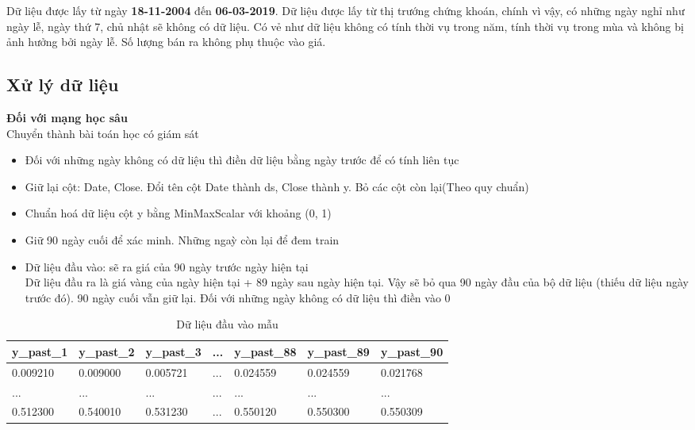 Dữ liệu được lấy từ ngày \textbf{18-11-2004} đến \textbf{06-03-2019}. 
Dữ liệu được lấy từ thị trướng chứng khoán, chính vì vậy, có những ngày nghỉ như ngày lễ, ngày thứ 7, chủ nhật sẽ không có dữ liệu.
Có vẻ như dữ liệu không có tính thời vụ trong năm, tính thời vụ trong mùa và không bị ảnh hưởng bởi ngày lễ. Số lượng bán ra không phụ thuộc vào giá.

\subsection{Xử lý dữ liệu}

\textbf{Đối với mạng học sâu} \\
Chuyển thành bài toán học có giám sát
\begin{itemize}
    \item Đối với những ngày không có dữ liệu thì điền dữ liệu bằng ngày trước để có tính liên tục \\
    \item Giữ lại cột: Date, Close. Đổi tên cột Date thành ds, Close thành y. Bỏ các cột còn lại(Theo quy chuẩn) \\
    \item Chuẩn hoá dữ liệu cột y bằng MinMaxScalar với khoảng (0, 1) \\
    \item Giữ 90 ngày cuối để xác minh. Những ngaỳ còn lại để đem train \\
    \item Dữ liệu đầu vào: sẽ ra giá của 90 ngày trước ngày hiện tại \\
    Dữ liệu đầu ra là giá vàng của ngày hiện tại +  89 ngày sau ngày hiện tại. Vậy sẽ bỏ qua 90 ngày đầu của bộ dữ liệu (thiếu dữ liệu ngày trước đó). 90 ngày cuối vẫn giữ lại. Đối với những ngày không có dữ liệu thì điền vào 0 \\
\end{itemize}
\begin{table}[h]
	\begin{tabularx}{\textwidth}{X | X | X | X | X | X | X } 
		y\_past\_1	& y\_past\_2	 & y\_past\_3	& ...	& y\_past\_88	 & y\_past\_89	 & y\_past\_90 		\\ \hline
		0.009210	& 0.009000	& 0.005721	& ... & 0.024559	& 0.024559	& 0.021768\\ \hline
		...	& ...	& ...	& ... & ...	& ...	& ... \\ \hline
		0.512300	& 0.540010	& 0.531230	& ... & 0.550120	& 0.550300	& 0.550309\\ %
	\end{tabularx}
	\label{tab:table_input}
	\caption{Dữ liệu đầu vào mẫu}
\end{table}
